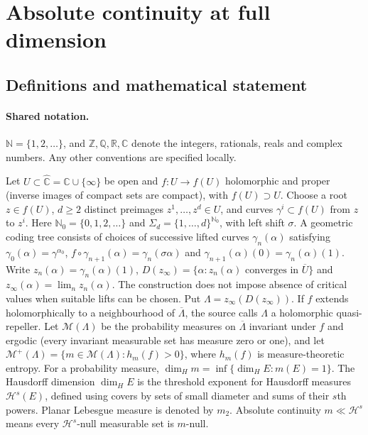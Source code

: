 \documentclass[11pt]{article}
\begin{document}
\section{Absolute continuity at full dimension}\label{statement}

\subsection{Definitions and mathematical statement}

\paragraph{Shared notation.}$\mathbb N=\{1,2,\ldots\}$, and $\mathbb Z,\mathbb Q,\mathbb R,\mathbb C$ denote the integers, rationals, reals and complex numbers. Any other conventions are specified locally.


Let $U\subset\widehat{\mathbb C}=\mathbb C\cup\{\infty\}$ be open and $f:U\to f(U)$ holomorphic and proper (inverse images of compact sets are compact), with $f(U)\supset U$. Choose a root $z\in f(U)$, $d\geq2$ distinct preimages $z^1,\ldots,z^d\in U$, and curves $\gamma^i\subset f(U)$ from $z$ to $z^i$. Here $\mathbb N_0=\{0,1,2,\ldots\}$ and $\Sigma_d=\{1,\ldots,d\}^{\mathbb N_0}$, with left shift $\sigma$. A geometric coding tree consists of choices of successive lifted curves $\gamma_n(\alpha)$ satisfying $\gamma_0(\alpha)=\gamma^{\alpha_0}$, $f\circ\gamma_{n+1}(\alpha)=\gamma_n(\sigma\alpha)$ and $\gamma_{n+1}(\alpha)(0)=\gamma_n(\alpha)(1)$. Write $z_n(\alpha)=\gamma_n(\alpha)(1)$, $D(z_\infty)=\{\alpha:z_n(\alpha)\text{ converges in }\overline U\}$ and $z_\infty(\alpha)=\lim_n z_n(\alpha)$. The construction does not impose absence of critical values when suitable lifts can be chosen. Put $\Lambda=z_\infty(D(z_\infty))$. If $f$ extends holomorphically to a neighbourhood of $\overline\Lambda$, the source calls $\Lambda$ a holomorphic quasi-repeller. Let $\mathcal M(\Lambda)$ be the probability measures on $\overline\Lambda$ invariant under $f$ and ergodic (every invariant measurable set has measure zero or one), and let $\mathcal M^+(\Lambda)=\{m\in\mathcal M(\Lambda):h_m(f)>0\}$, where $h_m(f)$ is measure-theoretic entropy. For a probability measure, $\dim_Hm=\inf\{\dim_HE:m(E)=1\}$. The Hausdorff dimension $\dim_H E$ is the threshold exponent for Hausdorff measures $\mathcal H^s(E)$, defined using covers by sets of small diameter and sums of their $s$th powers. Planar Lebesgue measure is denoted by $m_2$. Absolute continuity $m\ll\mathcal H^s$ means every $\mathcal H^s$-null measurable set is $m$-null.
\end{document}
